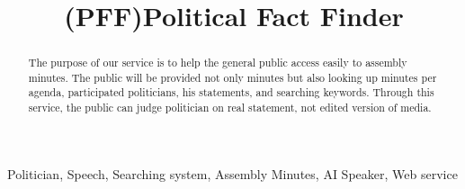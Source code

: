 \documentclass[conference]{IEEEtran}
\begin{document}
 
\title{(PFF)Political Fact Finder \\
}
\author{
\and
{}
\and
{}
\and
{}
}
\maketitle
 
\begin{abstract}
The purpose of our service is to help the general public access easily to assembly minutes. The public will be provided not only minutes but also looking up minutes per agenda, participated politicians, his statements, and searching keywords. Through this service, the public can judge politician on real statement, not edited version of media.\linebreak \\
\end{abstract}
 
\begin{IEEEkeywords}
Politician, Speech, Searching system, Assembly Minutes, AI Speaker, Web service  \linebreak \\
\end{IEEEkeywords}
 
\end{document}

